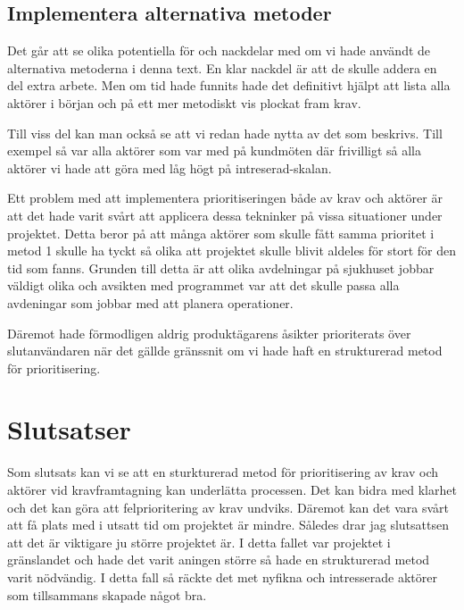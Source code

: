 \subsection{Implementera alternativa metoder}
Det går att se olika potentiella för och nackdelar med om vi hade användt de alternativa metoderna i denna text. En klar nackdel är att de skulle addera en del extra arbete. Men om tid hade funnits hade det definitivt hjälpt att lista alla aktörer i början och på ett mer metodiskt vis plockat fram krav.

Till viss del kan man också se att vi redan hade nytta av det som beskrivs. Till exempel så var alla aktörer som var med på kundmöten där frivilligt så alla aktörer vi hade att göra med låg högt på intreserad-skalan. 

Ett problem med att implementera prioritiseringen både av krav och aktörer är att det hade varit svårt att applicera dessa tekninker på vissa situationer under projektet. Detta beror på att många aktörer som skulle fått samma prioritet i metod 1 skulle ha tyckt så olika att projektet skulle blivit aldeles för stort för den tid som fanns. Grunden till detta är att olika avdelningar på sjukhuset jobbar väldigt olika och avsikten med programmet var att det skulle passa alla avdeningar som jobbar med att planera operationer. 

Däremot hade förmodligen aldrig produktägarens åsikter prioriterats över slutanvändaren när det gällde gränssnit om vi hade haft en strukturerad metod för prioritisering.

\section{Slutsatser}
Som slutsats kan vi se att en sturkturerad metod för prioritisering av krav och aktörer vid kravframtagning kan underlätta processen. Det kan bidra med klarhet och det kan göra att felprioritering av krav undviks. Däremot kan det vara svårt att få plats med i utsatt tid om projektet är mindre. Således drar jag slutsattsen att det är viktigare ju större projektet är. I detta fallet var projektet i gränslandet och hade det varit aningen större så hade en strukturerad metod varit nödvändig. I detta fall så räckte det met nyfikna och intresserade aktörer som tillsammans skapade något bra. 




